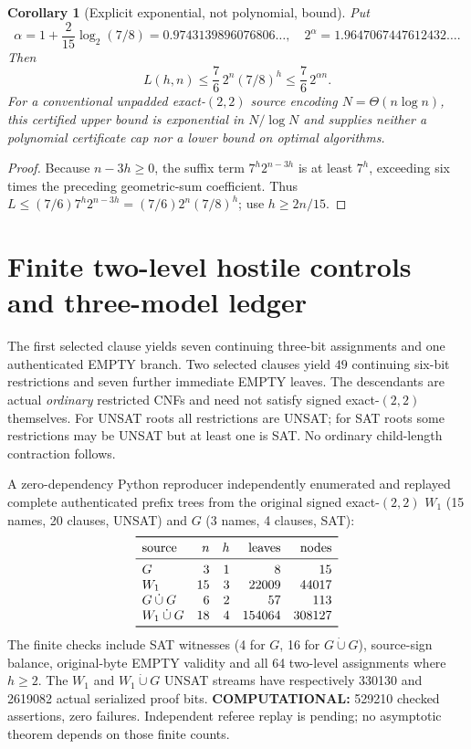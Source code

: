 \documentclass[11pt]{article}
\newtheorem{corollary}[theorem]{Corollary}
\begin{document}
\begin{corollary}[Explicit exponential, not polynomial, bound]\label{cor:alpha}
Put
\[
\alpha=1+\frac{2}{15}\log_2(7/8)=0.9743139896076806\ldots,
\quad 2^\alpha=1.9647067447612432\ldots.
\]
Then
\[
\boxed{L(h,n)\le\frac76\,2^n(7/8)^h
\le\frac76\,2^{\alpha n}.}\tag{3}
\]
For a conventional unpadded exact-$(2,2)$ source encoding $N=\Theta(n\log n)$, this certified \emph{upper} bound is exponential in $N/\log N$ and supplies neither a polynomial certificate cap nor a lower bound on optimal algorithms.
\end{corollary}
\begin{proof}
Because $n-3h\ge0$, the suffix term $7^h2^{n-3h}$ is at least $7^h$, exceeding six times the preceding geometric-sum coefficient. Thus $L\le(7/6)7^h2^{n-3h}=(7/6)2^n(7/8)^h$; use $h\ge2n/15$.
\end{proof}

\section{Finite two-level hostile controls and three-model ledger}
The first selected clause yields seven continuing three-bit assignments and one authenticated EMPTY branch. Two selected clauses yield $49$ continuing six-bit restrictions and seven further immediate EMPTY leaves. The descendants are actual \emph{ordinary} restricted CNFs and need not satisfy signed exact-$(2,2)$ themselves. For UNSAT roots all restrictions are UNSAT; for SAT roots some restrictions may be UNSAT but at least one is SAT. No ordinary child-length contraction follows.

A zero-dependency Python reproducer independently enumerated and replayed complete authenticated prefix trees from the original signed exact-$(2,2)$ $W_1$ (15 names, 20 clauses, UNSAT) and $G$ (3 names, 4 clauses, SAT):
\[
\begin{array}{lrrrr}
\toprule
\text{source}& n & h & \text{leaves} & \text{nodes}\\\midrule
G&3&1&8&15\\
W_1&15&3&22009&44017\\
G\mathbin{\dot\cup}G&6&2&57&113\\
W_1\mathbin{\dot\cup}G&18&4&154064&308127\\
\bottomrule
\end{array}
\]
The finite checks include SAT witnesses (4 for $G$, 16 for $G\dot\cup G$), source-sign balance, original-byte EMPTY validity and all 64 two-level assignments where $h\ge2$. The $W_1$ and $W_1\dot\cup G$ UNSAT streams have respectively 330130 and 2619082 actual serialized proof bits. \textbf{COMPUTATIONAL:} 529210 checked assertions, zero failures. Independent referee replay is pending; no asymptotic theorem depends on those finite counts.
\end{document}
